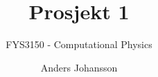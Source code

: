 \documentclass[12pt,a4paper,norsk]{article}
\title{Prosjekt 1}
\subtitle{FYS3150 - Computational Physics}
\author{Anders Johansson}
\begin{document}
\mnfrontpage
\end{document}
